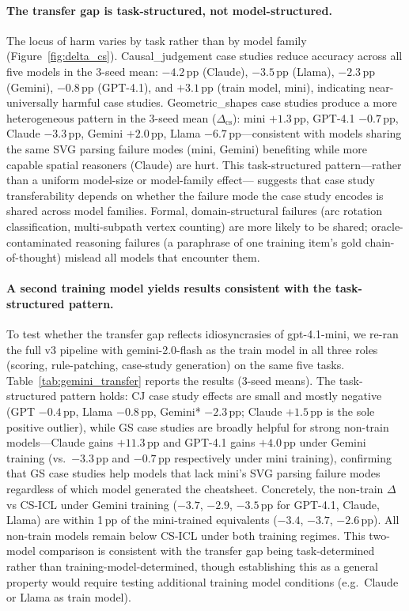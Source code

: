 \documentclass{article}
\begin{document}
\paragraph{The transfer gap is task-structured, not model-structured.}
The locus of harm varies by task rather than by model family (Figure~\ref{fig:delta_cs}).
Causal\_judgement case studies reduce accuracy across all five models in the 3-seed mean:
$-4.2$\,pp (Claude), $-3.5$\,pp (Llama), $-2.3$\,pp (Gemini), $-0.8$\,pp (GPT-4.1),
and $+3.1$\,pp (train model, mini), indicating near-universally harmful case studies.
Geometric\_shapes case studies produce a more heterogeneous pattern in the 3-seed mean
($\Delta_\text{cs}$): mini $+1.3$\,pp, GPT-4.1 $-0.7$\,pp, Claude $-3.3$\,pp, Gemini $+2.0$\,pp,
Llama $-6.7$\,pp---consistent with models sharing the same SVG parsing failure modes
(mini, Gemini) benefiting while more capable spatial reasoners (Claude) are hurt.
This task-structured pattern---rather than a uniform model-size or model-family effect---
suggests that case study transferability depends on whether the failure mode the case study
encodes is shared across model families.
Formal, domain-structural failures (arc rotation classification, multi-subpath vertex counting)
are more likely to be shared; oracle-contaminated reasoning failures (a paraphrase of one
training item's gold chain-of-thought) mislead all models that encounter them.

\paragraph{A second training model yields results consistent with the task-structured pattern.}
To test whether the transfer gap reflects idiosyncrasies of gpt-4.1-mini, we re-ran the
full v3 pipeline with gemini-2.0-flash as the train model in all three roles
(scoring, rule-patching, case-study generation) on the same five tasks.
Table~\ref{tab:gemini_transfer} reports the results (3-seed means).
The task-structured pattern holds: CJ case study effects are small and mostly negative
(GPT $-0.4$\,pp, Llama $-0.8$\,pp, Gemini* $-2.3$\,pp; Claude $+1.5$\,pp is the sole
positive outlier), while GS case studies are broadly helpful for strong non-train
models---Claude gains $+11.3$\,pp and GPT-4.1 gains $+4.0$\,pp under Gemini training
(vs.\ $-3.3$\,pp and $-0.7$\,pp respectively under mini training), confirming that GS
case studies help models that lack mini's SVG parsing failure modes regardless of which
model generated the cheatsheet.
Concretely, the non-train $\Delta$ vs CS-ICL under Gemini training ($-3.7$, $-2.9$, $-3.5$\,pp
for GPT-4.1, Claude, Llama) are within 1\,pp of the mini-trained equivalents
($-3.4$, $-3.7$, $-2.6$\,pp).
All non-train models remain below CS-ICL under both training regimes.
This two-model comparison is consistent with the transfer gap being task-determined rather
than training-model-determined, though establishing this as a general property would require
testing additional training model conditions (e.g.\ Claude or Llama as train model).
\end{document}
